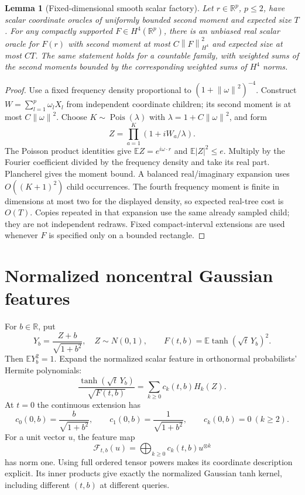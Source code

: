 \documentclass[11pt]{article}
\newtheorem{lemma}[theorem]{Lemma}
\theoremstyle{remark}\newtheorem{remark}[theorem]{Remark}
\newcommand{\R}{\mathbb R}
\newcommand{\E}{\mathbb E}
\newcommand{\norm}[1]{\left\lVert #1\right\rVert}
\begin{document}
\begin{lemma}[Fixed-dimensional smooth scalar factory]\label{lem:factory}
Let $r\in\R^p$, $p\le2$, have scalar coordinate oracles of uniformly
bounded second moment and expected size $T$. For any compactly supported
$F\in H^4(\R^p)$, there is an unbiased real scalar oracle for $F(r)$ with
second moment at most $C\norm F_{H^4}^2$ and expected size at most $CT$.
The same statement holds for a countable family, with weighted sums of
the second moments bounded by the corresponding weighted sums of
$H^4$ norms.
\end{lemma}
\begin{proof}
Use a fixed frequency density proportional to $(1+\norm\omega^2)^{-4}$.
Construct $W=\sum_{l=1}^p\omega_lX_l$ from independent coordinate
children; its second moment is at most $C\norm\omega^2$. Choose
$K\sim\operatorname{Pois}(\lambda)$ with
$\lambda=1+C\norm\omega^2$, and form
\[
 Z=\prod_{a=1}^K(1+iW_a/\lambda).
\]
The Poisson product identities give $\E Z=e^{i\omega\cdot r}$ and
$\E|Z|^2\le e$. Multiply by the Fourier coefficient divided by the
frequency density and take its real part. Plancherel gives the moment
bound. A balanced real/imaginary expansion uses $O((K+1)^2)$ child
occurrences. The fourth frequency moment is finite in dimensions at most
two for the displayed density, so expected real-tree cost is $O(T)$.
Copies repeated in that expansion use the same already sampled child;
they are not independent redraws. Fixed compact-interval extensions are
used whenever $F$ is specified only on a bounded rectangle.
\end{proof}

\section{Normalized noncentral Gaussian features}

For $b\in\R$, put
\[
 Y_b=\frac{Z+b}{\sqrt{1+b^2}},\quad Z\sim N(0,1),
 \qquad F(t,b)=\E\tanh(\sqrt t\,Y_b)^2.
\]
Then $\E Y_b^2=1$. Expand the normalized scalar feature in orthonormal
probabilists' Hermite polynomials:
\begin{equation}\label{eq:hermite}
 \frac{\tanh(\sqrt t\,Y_b)}{\sqrt{F(t,b)}}
       =\sum_{k\ge0}c_k(t,b)H_k(Z).
\end{equation}
At $t=0$ the continuous extension has
\[
 c_0(0,b)=\frac b{\sqrt{1+b^2}},\qquad
 c_1(0,b)=\frac1{\sqrt{1+b^2}},\qquad c_k(0,b)=0\ (k\ge2).
\]
For a unit vector $u$, the feature map
\begin{equation}\label{eq:fock}
 \mathcal F_{t,b}(u)=\bigoplus_{k\ge0}c_k(t,b)u^{\otimes k}
\end{equation}
has norm one. Using full ordered tensor powers makes its coordinate
description explicit. Its inner products give exactly the normalized
Gaussian tanh kernel, including different $(t,b)$ at different queries.
\end{document}
